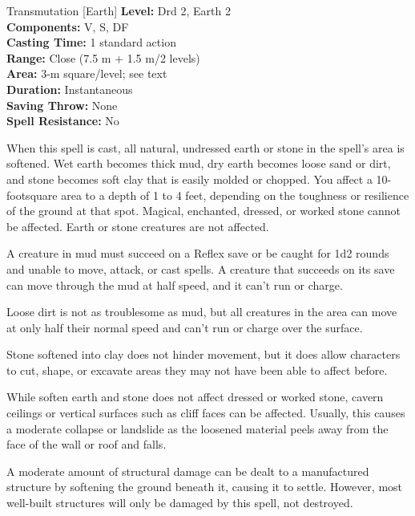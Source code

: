 {Transmutation [Earth]}
{
	\textbf{Level:}
	Drd 2, Earth 2\\
	\textbf{Components:}
	V, S, DF\\
	\textbf{Casting Time:}
	1 standard action\\
	\textbf{Range:}
	Close (7.5 m + 1.5 m/2 levels)\\
	\textbf{Area:}
	3-m square/level; see text\\
	\textbf{Duration:}
	Instantaneous\\
	\textbf{Saving Throw:}
	None\\
	\textbf{Spell Resistance:}
	No\\
}
{
	When this spell is cast, all natural, undressed earth or stone in the spell's area is softened. Wet earth becomes thick mud, dry earth becomes loose sand or dirt, and stone becomes soft clay that is easily molded or chopped. You affect a 10-footsquare area to a depth of 1 to 4 feet, depending on the toughness or resilience of the ground at that spot. Magical, enchanted, dressed, or worked stone cannot be affected. Earth or stone creatures are not affected.

	A creature in mud must succeed on a Reflex save or be caught for 1d2 rounds and unable to move, attack, or cast spells. A creature that succeeds on its save can move through the mud at half speed, and it can't run or charge.

	Loose dirt is not as troublesome as mud, but all creatures in the area can move at only half their normal speed and can't run or charge over the surface.

	Stone softened into clay does not hinder movement, but it does allow characters to cut, shape, or excavate areas they may not have been able to affect before.

	While soften earth and stone does not affect dressed or worked stone, cavern ceilings or vertical surfaces such as cliff faces can be affected. Usually, this causes a moderate collapse or landslide as the loosened material peels away from the face of the wall or roof and falls.

	A moderate amount of structural damage can be dealt to a manufactured structure by softening the ground beneath it, causing it to settle. However, most well-built structures will only be damaged by this spell, not destroyed.

}
